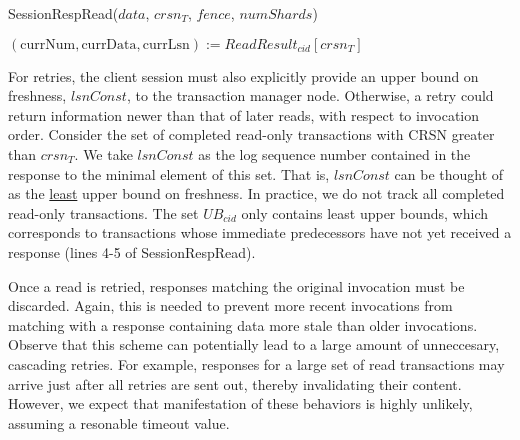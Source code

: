 \documentclass{article}
\begin{document}
\begin{procedure}[H]
  \caption{SessionRespRead($data$, $crsn_T$, $fence$, $numShards$)}
  $(\text{currNum}, \text{currData}, \text{currLsn}) := ReadResult_{cid}[crsn_T]$ \\
\end{procedure}
\par For retries, the client session must also explicitly provide an upper bound on freshness, $lsnConst$, to the transaction manager node. Otherwise, a retry could return information newer than that of later reads, with respect to invocation order. Consider the set of completed read-only transactions with CRSN greater than $crsn_T$. We take $lsnConst$ as the log sequence number contained in the response to the minimal element of this set. That is, $lsnConst$ can be thought of as the \underline{least} upper bound on freshness. In practice, we do not track all completed read-only transactions. The set $UB_{cid}$ only contains least upper bounds, which corresponds to transactions whose immediate predecessors have not yet received a response (lines 4-5 of SessionRespRead). 
\par Once a read is retried, responses matching the original invocation must be discarded. Again, this is needed to prevent more recent invocations from matching with a response containing data more stale than older invocations. Observe that this scheme can potentially lead to a large amount of unneccesary, cascading retries. For example, responses for a large set of read transactions may arrive just after all retries are sent out, thereby invalidating their content. However, we expect that manifestation of these behaviors is highly unlikely, assuming a resonable timeout value. 
\end{document}
